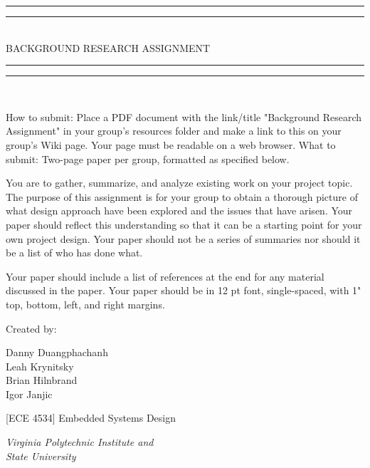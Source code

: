 
\begin{titlepage}

\centering
\vspace*{\baselineskip}

\rule{\textwidth}{1.6pt}\vspace*{-\baselineskip}\vspace*{2pt}
\rule{\textwidth}{0.4pt}\\[\baselineskip]

{\LARGE BACKGROUND RESEARCH ASSIGNMENT}\\[0.2\baselineskip]

\rule{\textwidth}{0.4pt}\vspace*{-\baselineskip}\vspace{3.2pt}
\rule{\textwidth}{1.6pt}\\[\baselineskip]

\wl

\scshape
{\small How to submit: Place a PDF document with the link/title "Background Research
Assignment" in your group's resources folder and make a link to this on your
group's Wiki page. Your page must be readable on a web browser. What to submit:
Two-page paper per group, formatted as specified below.

You are to gather, summarize, and analyze existing work on your project topic.
The purpose of this assignment is for your group to obtain a thorough picture of
what design approach have been explored and the issues that have arisen. Your
paper should reflect this understanding so that it can be a starting point for
your own project design. Your paper should not be a series of summaries nor
should it be a list of who has done what.

Your paper should include a list of references at the end for any material
discussed in the paper. Your paper should be in 12 pt font, single-spaced,
with 1" top, bottom, left, and right margins.
\\[\baselineskip]\par}

\vfill

Created by:\\[0.3\baselineskip]
{Danny Duangphachanh\\ Leah Krynitsky\\ Brian Hilnbrand\\ Igor Janjic\par}
{\small [ECE 4534] Embedded Systems Design\\\par}
{\small\itshape Virginia Polytechnic Institute and\\ State University\par}


\end{titlepage}

